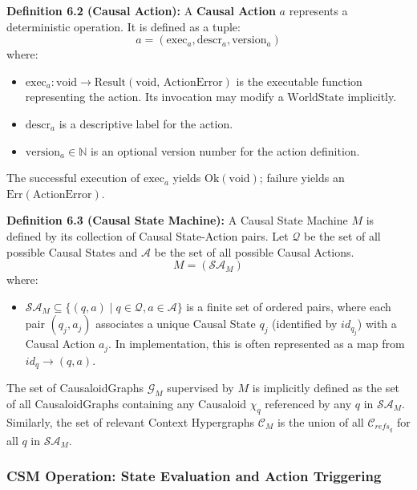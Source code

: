 \noindent\textbf{Definition 6.2 (Causal Action):} A \textbf{Causal Action} \(a\) represents a deterministic operation. It is defined as a tuple:
\[ a = (\text{exec}_a, \text{descr}_a, \text{version}_a) \]
where:
\begin{itemize}
    \item \( \text{exec}_a: \text{void} \to \text{Result}(\text{void, ActionError}) \) is the executable function representing the action. Its invocation may modify a \(\text{WorldState}\) implicitly.
    \item \( \text{descr}_a \) is a descriptive label for the action.
    \item \( \text{version}_a \in \mathbb{N} \) is an optional version number for the action definition.
\end{itemize}
The successful execution of \( \text{exec}_a \) yields \( \text{Ok}(\text{void}) \); failure yields an \( \text{Err}(\text{ActionError}) \).

\vspace{\baselineskip} %

\noindent\textbf{Definition 6.3 (Causal State Machine):} A Causal State Machine \( M \) is defined by its collection of Causal State-Action pairs. Let \(\mathcal{Q}\) be the set of all possible Causal States and \(\mathcal{A}\) be the set of all possible Causal Actions.
\[ M = (\mathcal{SA}_M) \]
where:
\begin{itemize}
    \item \( \mathcal{SA}_M \subseteq \{(q, a) \mid q \in \mathcal{Q}, a \in \mathcal{A}\} \) is a finite set of ordered pairs, where each pair \( (q_j, a_j) \) associates a unique Causal State \(q_j\) (identified by \(id_{q_j}\)) with a Causal Action \(a_j\). In implementation, this is often represented as a map from \(id_q \to (q, a)\).
\end{itemize}
The set of CausaloidGraphs \(\mathcal{G}_M\) supervised by \(M\) is implicitly defined as the set of all CausaloidGraphs containing any Causaloid \(\chi_q\) referenced by any \(q\) in \(\mathcal{SA}_M\). Similarly, the set of relevant Context Hypergraphs \(\mathcal{C}_M\) is the union of all \(\mathcal{C}_{refs_q}\) for all \(q\) in \(\mathcal{SA}_M\).

\subsubsection[CSM Operation: State Evaluation and Action Triggering]{CSM Operation: State Evaluation and Action Triggering}
\label{ssec:csm_operation_formal_merged}

